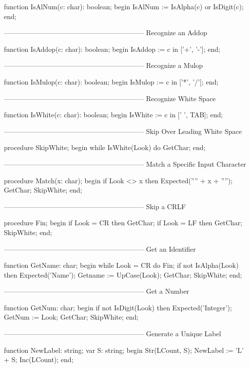 \documentclass[float=false, crop=false]{standalone}
\begin{document}
\begin{code}
function IsAlNum(c: char): boolean;
begin
   IsAlNum := IsAlpha(c) or IsDigit(c);
end;

{--------------------------------------------------------------}
{ Recognize an Addop }

function IsAddop(c: char): boolean;
begin
   IsAddop := c in ['+', '-'];
end;


{--------------------------------------------------------------}
{ Recognize a Mulop }

function IsMulop(c: char): boolean;
begin
   IsMulop := c in ['*', '/'];
end;


{--------------------------------------------------------------}
{ Recognize White Space }

function IsWhite(c: char): boolean;
begin
   IsWhite := c in [' ', TAB];
end;


{--------------------------------------------------------------}
{ Skip Over Leading White Space }

procedure SkipWhite;
begin
   while IsWhite(Look) do
      GetChar;
end;


{--------------------------------------------------------------}
{ Match a Specific Input Character }

procedure Match(x: char);
begin
   if Look <> x then Expected('''' + x + '''');
   GetChar;
   SkipWhite;
end;


{--------------------------------------------------------------}
{ Skip a CRLF }

procedure Fin;
begin
   if Look = CR then GetChar;
   if Look = LF then GetChar;
   SkipWhite;
end;


{--------------------------------------------------------------}
{ Get an Identifier }

function GetName: char;
begin
   while Look = CR do
      Fin;
   if not IsAlpha(Look) then Expected('Name');
   Getname := UpCase(Look);
   GetChar;
   SkipWhite;
end;


{--------------------------------------------------------------}
{ Get a Number }

function GetNum: char;
begin
   if not IsDigit(Look) then Expected('Integer');
   GetNum := Look;
   GetChar;
   SkipWhite;
end;


{--------------------------------------------------------------}
{ Generate a Unique Label }

function NewLabel: string;
var S: string;
begin
   Str(LCount, S);
   NewLabel := 'L' + S;
   Inc(LCount);
end;



\end{code}
\end{document}
